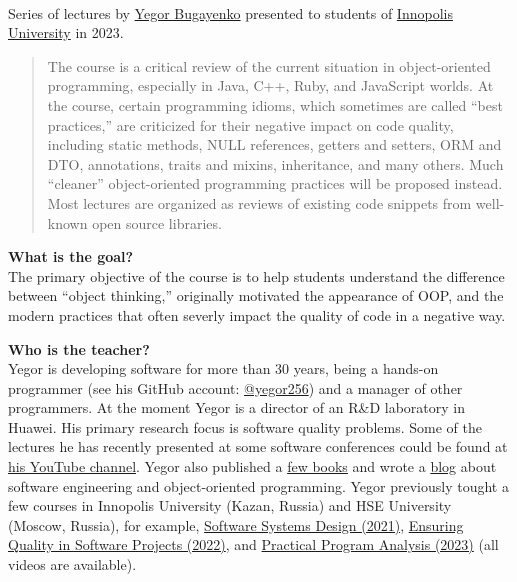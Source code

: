 \documentclass[nobrand,anonymous,nodate,nosecurity]{huawei}
\begin{document}
{\\
Series of lectures by \href{https://www.yegor256.com}{Yegor Bugayenko} presented
to students of \href{https://innopolis.university/en/}{Innopolis University} in 2023.\\


\begin{abstract}
The course is a critical review of the current situation in object-oriented programming,
especially in Java, C++, Ruby, and JavaScript worlds. At the course, certain programming
idioms, which sometimes are called ``best practices,'' are criticized for their
negative impact on code quality, including static methods, NULL references, getters
and setters, ORM and DTO, annotations, traits and mixins, inheritance, and many others.
Much ``cleaner'' object-oriented programming practices will be proposed instead. Most
lectures are organized as reviews of existing code snippets from well-known
open source libraries.
\end{abstract}


\textbf{What is the goal?}\\
The primary objective of the course is to help students understand the
difference between ``object thinking,'' originally motivated the
appearance of OOP, and the modern practices that often
severly impact the quality of code in a negative way.

\textbf{Who is the teacher?}\\
Yegor is developing software for more than 30 years, being a hands-on programmer
(see his GitHub account: \href{https://github.com/yegor256}{@yegor256})
and a manager of other programmers. At the moment Yegor is a director
of an R\&D laboratory in Huawei. His primary research focus is
software quality problems. Some of the lectures he has recently presented
at some software conferences could be found at
\href{https://www.youtube.com/channel/UCr9qCdqXLm2SU0BIs6d_68Q}{his YouTube channel}.
Yegor also published a \href{https://www.yegor256.com/books.html}{few books}
and wrote a \href{https://www.yegor256.com/contents.html}{blog} about software engineering
and object-oriented programming.
Yegor previously tought a few courses in
Innopolis University (Kazan, Russia)
and HSE University (Moscow, Russia),
for example,
\href{https://github.com/yegor256/ssd16}{Software Systems Design (2021)},
\href{https://github.com/yegor256/eqsp}{Ensuring Quality in Software Projects (2022)},
and
\href{https://github.com/yegor256/ppa}{Practical Program Analysis (2023)}
(all videos are available).

}
\end{document}
